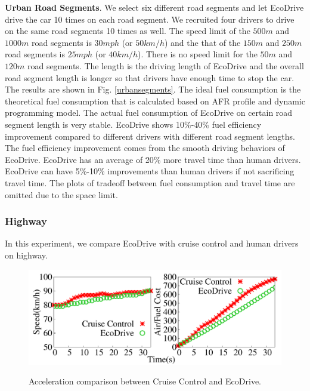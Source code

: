\textbf{Urban Road Segments}. 
We select six different road segments and let EcoDrive drive the car 10 times on each road segment. 
We recruited four drivers to drive on the same
road segments 10 times as well. 
The speed limit of the $500m$ and $1000m$ road segments
is $30mph$ (or $50km/h$) and the that of the $150m$
and $250m$ road segments is $25mph$ (or $40km/h$). 
There is no speed limit for the $50m$ and $120m$ road segments.
The length is the driving length of EcoDrive and 
the overall road segment length is longer so
that drivers have enough time to stop the car. 
The results are shown in Fig. \ref{urbansegments}. 
The ideal fuel consumption is the theoretical 
fuel consumption that is calculated based on AFR profile and dynamic programming model. 
The actual fuel consumption of EcoDrive on certain
road segment length is very stable. 
EcoDrive shows 10\%-40\% fuel efficiency improvement 
compared to different drivers with different road segment lengths. 
The fuel efficiency improvement comes from the smooth driving behaviors of EcoDrive. 
EcoDrive has an average of 20\% more travel time than human drivers.  
EcoDrive can have 5\%-10\% improvements than human drivers if not sacrificing travel time.
The plots of tradeoff between fuel consumption and travel time
are omitted due to the space limit. 

\subsubsection{Highway}


In this experiment, we compare EcoDrive with cruise control and human drivers
on highway. 

\begin{figure}[!htbp]
\begin{center}
\includegraphics[width=5.0in,angle=0]{Figs/EcoDrive/evaluation/cruise_ecodrive_compare.pdf}
\vspace{-0.0cm}
\caption{Acceleration comparison between Cruise Control and EcoDrive. }
\vspace{-0.4cm}
\label{cruiseecodrive}
\end{center}
\end{figure}


